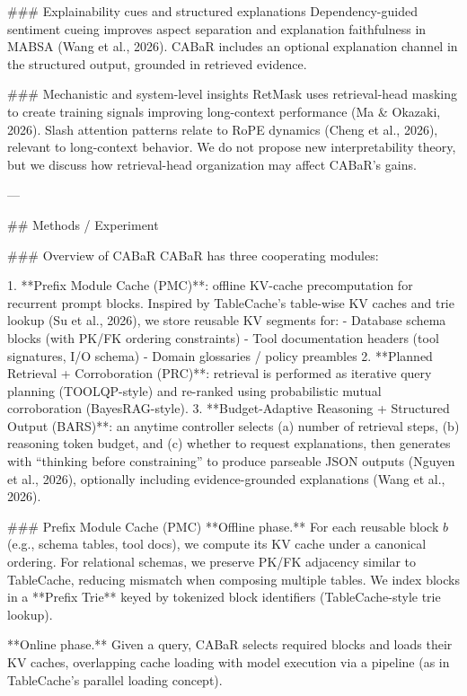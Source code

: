 ### Explainability cues and structured explanations  
Dependency-guided sentiment cueing improves aspect separation and explanation faithfulness in MABSA (Wang et al., 2026). CABaR includes an optional explanation channel in the structured output, grounded in retrieved evidence.

### Mechanistic and system-level insights  
RetMask uses retrieval-head masking to create training signals improving long-context performance (Ma & Okazaki, 2026). Slash attention patterns relate to RoPE dynamics (Cheng et al., 2026), relevant to long-context behavior. We do not propose new interpretability theory, but we discuss how retrieval-head organization may affect CABaR’s gains.

---

## Methods / Experiment  

### Overview of CABaR  
CABaR has three cooperating modules:

1. **Prefix Module Cache (PMC)**: offline KV-cache precomputation for recurrent prompt blocks. Inspired by TableCache’s table-wise KV caches and trie lookup (Su et al., 2026), we store reusable KV segments for:
   - Database schema blocks (with PK/FK ordering constraints)
   - Tool documentation headers (tool signatures, I/O schema)
   - Domain glossaries / policy preambles  
2. **Planned Retrieval + Corroboration (PRC)**: retrieval is performed as iterative query planning (TOOLQP-style) and re-ranked using probabilistic mutual corroboration (BayesRAG-style).  
3. **Budget-Adaptive Reasoning + Structured Output (BARS)**: an anytime controller selects (a) number of retrieval steps, (b) reasoning token budget, and (c) whether to request explanations, then generates with “thinking before constraining” to produce parseable JSON outputs (Nguyen et al., 2026), optionally including evidence-grounded explanations (Wang et al., 2026).

### Prefix Module Cache (PMC)  
**Offline phase.** For each reusable block \(b\) (e.g., schema tables, tool docs), we compute its KV cache under a canonical ordering. For relational schemas, we preserve PK/FK adjacency similar to TableCache, reducing mismatch when composing multiple tables. We index blocks in a **Prefix Trie** keyed by tokenized block identifiers (TableCache-style trie lookup).

**Online phase.** Given a query, CABaR selects required blocks and loads their KV caches, overlapping cache loading with model execution via a pipeline (as in TableCache’s parallel loading concept).

